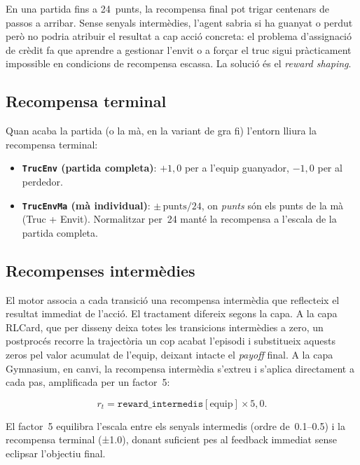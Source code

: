 En una partida fins a 24~punts, la recompensa final pot trigar centenars de passos
a arribar. Sense senyals intermèdies, l'agent sabria si ha guanyat o perdut però no
podria atribuir el resultat a cap acció concreta: el problema d'assignació de crèdit
fa que aprendre a gestionar l'envit o a forçar el truc sigui pràcticament impossible
en condicions de recompensa escassa. La solució és el \emph{reward shaping}.

\subsection*{Recompensa terminal}

Quan acaba la partida (o la mà, en la variant de gra fi) l'entorn lliura la
recompensa terminal:

\begin{itemize}
  \item \textbf{\texttt{TrucEnv} (partida completa)}: $+1{,}0$ per a l'equip
        guanyador, $-1{,}0$ per al perdedor.
  \item \textbf{\texttt{TrucEnvMa} (mà individual)}: $\pm\,\text{punts}/24$,
        on \emph{punts} són els punts de la mà (Truc + Envit). Normalitzar per~24
        manté la recompensa a l'escala de la partida completa.
\end{itemize}

\subsection*{Recompenses intermèdies}

El motor associa a cada transició una recompensa intermèdia que reflecteix el
resultat immediat de l'acció. El tractament difereix segons la capa. A la capa
RLCard, que per disseny deixa totes les transicions intermèdies a zero, un postprocés
recorre la trajectòria un cop acabat l'episodi i substitueix aquests zeros pel valor
acumulat de l'equip, deixant intacte el \emph{payoff} final. A la capa Gymnasium, en
canvi, la recompensa intermèdia s'extreu i s'aplica directament a cada pas,
amplificada per un factor~5:

\begin{equation}
  r_t = \texttt{reward\_intermedis}[\text{equip}] \times 5{,}0.
  \label{eq:reward-gym}
\end{equation}

El factor~5 equilibra l'escala entre els senyals intermedis (ordre de~0.1--0.5) i
la recompensa terminal (±1.0), donant suficient pes al feedback immediat sense
eclipsar l'objectiu final.

